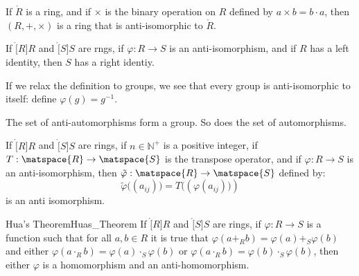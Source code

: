 \documentclass{article}                                                        %
\begin{document}
                \begin{theorem}
                    If $\ring{R}$ is a ring, and if $\times$ is the binary
                    operation on $R$ defined by $a\times{b}=b\cdot{a}$, then
                    $(R,+,\times)$ is a ring that is anti-isomorphic to
                    $\ring{R}$.
                \end{theorem}
                \begin{theorem}
                    If $\ring[R]{R}$ and $\ring[S]{S}$ are rngs, if
                    $\varphi:R\rightarrow{S}$ is an anti-isomorphism, and if
                    $R$ has a left identity, then $S$ has a right identiy.
                \end{theorem}
                If we relax the definition to groups, we see that every group is
                anti-isomorphic to itself: define $\varphi(g)=g^{\minus{1}}$.
                \begin{theorem}
                    The set of anti-automorphisms form a group. So does the set
                    of automorphisms.
                \end{theorem}
                \begin{theorem}
                    If $\ring[R]{R}$ and $\ring[S]{S}$ are rings, if
                    $n\in\mathbb{N}^{+}$ is a positive integer, if
                    $T:\matspace{R}\rightarrow\matspace{S}$ is the transpose
                    operator, and if $\varphi:R\rightarrow{S}$ is an
                    anti-isomorphism, then
                    $\tilde{\varphi}:\matspace{R}\rightarrow\matspace{S}$
                    defined by:
                    \begin{equation}
                        \tilde{\varphi}\big((a_{ij})\big)
                            =T\big((\varphi(a_{ij})\big))
                    \end{equation}
                    is an anti isomorphism.
                \end{theorem}
                \begin{ftheorem}{Hua's Theorem}{Huas_Theorem}
                    If $\ring[R]{R}$ and $\ring[S]{S}$ are rings, if
                    $\varphi:R\rightarrow{S}$ is a function such that for all
                    $a,b\in{R}$ it is true that
                    $\varphi(a+_{R}b)=\varphi(a)+_{S}\varphi(b)$ and either
                    $\varphi(a\cdot_{R}b)=\varphi(a)\cdot_{S}\varphi(b)$ or
                    $\varphi(a\cdot_{R}b)=\varphi(b)\cdot_{S}\varphi(b)$, then
                    either $\varphi$ is a homomorphism and an anti-homomorphism.
                \end{ftheorem}
\end{document}
